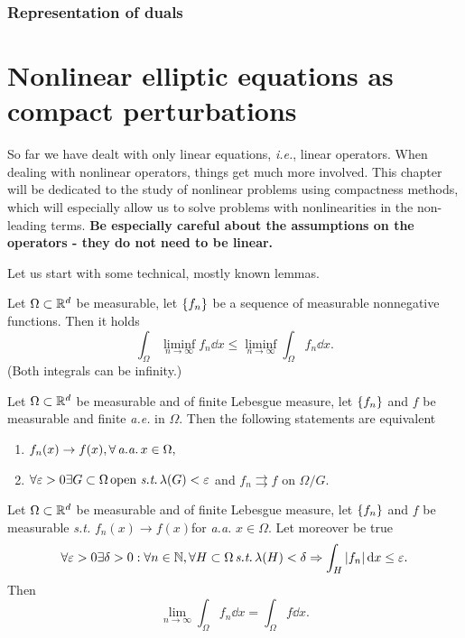 \documentclass{article}
\begin{document}
\subsubsection{Representation of duals}
\label{sec:dual_representation}

\section{Nonlinear elliptic equations as compact perturbations}
\label{sec:nonlinear_elliptic_compact}

So far we have dealt with only linear equations, \textit{i.e.}, linear operators. When dealing with nonlinear operators, things get much more involved. This chapter will be dedicated to the study of nonlinear problems using compactness methods, which will especially allow us to solve problems with nonlinearities in the non-leading terms. \textbf{Be especially careful about the assumptions on the operators - they do not need to be linear.}

Let us start with some technical, mostly known lemmas.


\begin{lemma}[Fatou]
	Let $\Omega \subset {\mathbb R}^{d}$ be measurable, let $\qty{f_n}$ be a sequence of measurable nonnegative functions. Then it holds
	\[
		\int_{\Omega}\liminf_{n\to \infty}f_n\dd{x} \leq \liminf_{n \to \infty}\int_{\Omega}f_n\dd{x}.
	\]
	(Both integrals can be infinity.)
    
\end{lemma}

\begin{theorem}[Iegorov]
	Let $\Omega \subset {\mathbb R}^{d}$ be measurable and of finite Lebesgue measure, let $\qty{f_n}$ and $f$ be measurable and finite \textit{a.e.} in $\Omega$. Then the following statements are equivalent
\begin{enumerate}
	\item $f_n(x) \to f(x), \forall \, \text{\textit{a.a.}} \,x \in \Omega,$
	\item $\forall \varepsilon >0 \exists G \subset \Omega \, \text{open} \, \, \text{\textit{s.t.}} \, \lambda(G) < \varepsilon$ and $f_n \rightrightarrows f$ on $\Omega / G.$
\end{enumerate}
\end{theorem}

\begin{theorem}[Vitali]
    Let $\Omega \subset {\mathbb R}^{d}$ be measurable and of finite Lebesgue measure, let $\qty{f_n}$ and $f$ be measurable \textit{s.t.} $f_n(x) \to f(x)$for \textit{a.a.} $x \in \Omega$. Let moreover be true
    \[
	    \forall \varepsilon > 0 \exists \delta >0: \forall n \in {\mathbb N}, \forall H \subset \Omega \, \text{\textit{s.t.}} \, \lambda(H) < \delta \Rightarrow \int_{H}|f_n|\dd{x} \leq \varepsilon.
    \]
    Then
    \[
	    \lim_{n\to \infty} \int_{\Omega}f_n\dd{x} = \int_{\Omega}f\dd{x}.
    \]
\end{theorem}
\end{document}
